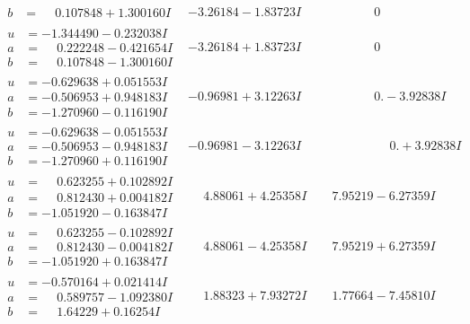 \documentclass[1p]{elsarticle_modified}
\theoremstyle{definition}
\begin{document}
$$\begin{array}{c|c|c}
\begin{aligned}
b &= \phantom{-}0.107848 + 1.300160 I\end{aligned}
 & -3.26184 - 1.83723 I & \phantom{-0.000000 } 0 \\ \hline\begin{aligned}
u &= -1.344490 - 0.232038 I \\
a &= \phantom{-}0.222248 - 0.421654 I \\
b &= \phantom{-}0.107848 - 1.300160 I\end{aligned}
 & -3.26184 + 1.83723 I & \phantom{-0.000000 } 0 \\ \hline\begin{aligned}
u &= -0.629638 + 0.051553 I \\
a &= -0.506953 + 0.948183 I \\
b &= -1.270960 - 0.116190 I\end{aligned}
 & -0.96981 + 3.12263 I & \phantom{-0.000000 } 0. - 3.92838 I \\ \hline\begin{aligned}
u &= -0.629638 - 0.051553 I \\
a &= -0.506953 - 0.948183 I \\
b &= -1.270960 + 0.116190 I\end{aligned}
 & -0.96981 - 3.12263 I & \phantom{-0.000000 -}0. + 3.92838 I \\ \hline\begin{aligned}
u &= \phantom{-}0.623255 + 0.102892 I \\
a &= \phantom{-}0.812430 + 0.004182 I \\
b &= -1.051920 - 0.163847 I\end{aligned}
 & \phantom{-}4.88061 + 4.25358 I & \phantom{-}7.95219 - 6.27359 I \\ \hline\begin{aligned}
u &= \phantom{-}0.623255 - 0.102892 I \\
a &= \phantom{-}0.812430 - 0.004182 I \\
b &= -1.051920 + 0.163847 I\end{aligned}
 & \phantom{-}4.88061 - 4.25358 I & \phantom{-}7.95219 + 6.27359 I \\ \hline\begin{aligned}
u &= -0.570164 + 0.021414 I \\
a &= \phantom{-}0.589757 - 1.092380 I \\
b &= \phantom{-}1.64229 + 0.16254 I\end{aligned}
 & \phantom{-}1.88323 + 7.93272 I & \phantom{-}1.77664 - 7.45810 I \\ \hline\begin{aligned}

\end{aligned}
\end{array}$$
\end{document}
